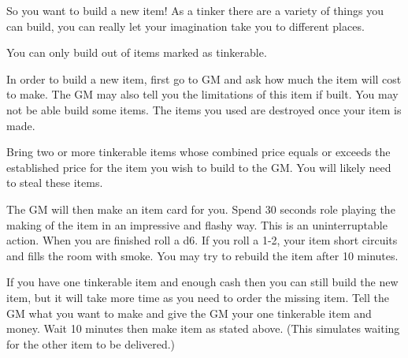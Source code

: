 \documentclass[green]{LRSguildcamp1}
\begin{document}
\name{\gTinkering{}}

So you want to build a new item! As a tinker there are a variety of things you can build, you can really let your imagination take you to different places. 

You can only build out of items marked as tinkerable.

In order to build a new item, first go to GM and ask how much the item will cost to make. The GM may also tell you the limitations of this item if built. You may not be able build some items. The items you used are destroyed once your item is made.

Bring two or more tinkerable items whose combined price equals or exceeds the established price for the item you wish to build to the GM. You will likely need to steal these items. 

The GM will then make an item card for you. Spend 30 seconds role playing the making of the item in an impressive and flashy way. This is an uninterruptable action. When you are finished roll a d6.  If you roll a 1-2, your item short circuits and fills the room with smoke. You may try to rebuild the item after 10 minutes. 

If you have one tinkerable item and enough cash then you can still build the new item, but it will take more time as you need to order the missing item. Tell the GM what you want to make and give the GM your one tinkerable item and money. Wait 10 minutes then make item as stated above. (This simulates waiting for the other item to be delivered.) 

\end{document}
